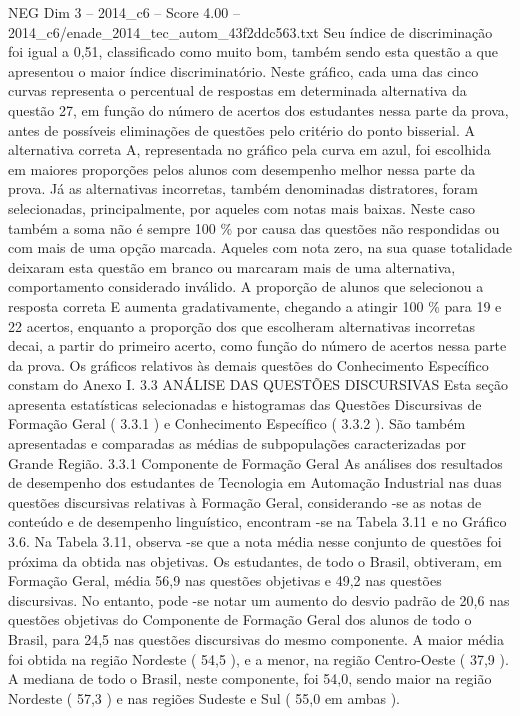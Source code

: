 \begin{textsample}{NEG Dim 3 – 2014\_c6 – Score 4.00 – 2014\_c6/enade\_2014\_tec\_autom\_43f2ddc563.txt}
Seu índice de discriminação foi igual a 0,51, classificado como muito bom, também sendo esta questão a que apresentou o maior índice discriminatório.
Neste gráfico, cada uma das cinco curvas representa o percentual de respostas em determinada alternativa da questão 27, em função do número de acertos dos estudantes nessa parte da prova, antes de possíveis eliminações de questões pelo critério do ponto bisserial.
A alternativa correta A, representada no gráfico pela curva em azul, foi escolhida em maiores proporções pelos alunos com desempenho melhor nessa parte da prova.
Já as alternativas incorretas, também denominadas distratores, foram selecionadas, principalmente, por aqueles com notas mais baixas.
Neste caso também a soma não é sempre 100 \% por causa das questões não respondidas ou com mais de uma opção marcada.
Aqueles com nota zero, na sua quase totalidade deixaram esta questão em branco ou marcaram mais de uma alternativa, comportamento considerado inválido.
A proporção de alunos que selecionou a resposta correta E aumenta gradativamente, chegando a atingir 100 \% para 19 e 22 acertos, enquanto a proporção dos que escolheram alternativas incorretas decai, a partir do primeiro acerto, como função do número de acertos nessa parte da prova.
Os gráficos relativos às demais questões do Conhecimento Específico constam do Anexo I. 3.3 ANÁLISE DAS QUESTÕES DISCURSIVAS Esta seção apresenta estatísticas selecionadas e histogramas das Questões Discursivas de Formação Geral ( 3.3.1 ) e Conhecimento Específico ( 3.3.2 ).
São também apresentadas e comparadas as médias de subpopulações caracterizadas por Grande Região. 3.3.1 Componente de Formação Geral As análises dos resultados de desempenho dos estudantes de Tecnologia em Automação Industrial nas duas questões discursivas relativas à Formação Geral, considerando -se as notas de conteúdo e de desempenho linguístico, encontram -se na Tabela 3.11 e no Gráfico 3.6.
Na Tabela 3.11, observa -se que a nota média nesse conjunto de questões foi próxima da obtida nas objetivas.
Os estudantes, de todo o Brasil, obtiveram, em Formação Geral, média 56,9 nas questões objetivas e 49,2 nas questões discursivas.
No entanto, pode -se notar um aumento do desvio padrão de 20,6 nas questões objetivas do Componente de Formação Geral dos alunos de todo o Brasil, para 24,5 nas questões discursivas do mesmo componente.
A maior média foi obtida na região Nordeste ( 54,5 ), e a menor, na região Centro-Oeste ( 37,9 ).
A mediana de todo o Brasil, neste componente, foi 54,0, sendo maior na região Nordeste ( 57,3 ) e nas regiões Sudeste e Sul ( 55,0 em ambas ).

\end{textsample}
